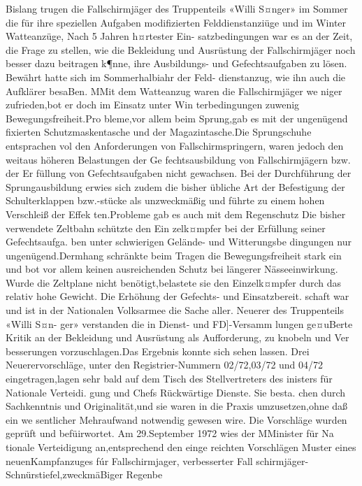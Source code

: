 Bislang trugen die Fallschirmjäger des Truppenteils
«Willi S¤nger» im Sommer die für ihre speziellen
Aufgaben modifizierten Felddienstanziüge und im
Winter Watteanzüge, Nach 5 Jahren h¤rtester Ein-
satzbedingungen war es an der Zeit, die Frage zu
stellen, wie die Bekleidung und Ausrüstung
der
Fallschirmjäger noch besser dazu beitragen k¶nne,
ihre Ausbildungs- und Gefechtsaufgaben zu lösen.
Bewährt hatte sich im Sommerhalbiahr der Feld-
dienstanzug, wie ihn auch die Aufklärer besaBen. MMit dem Watteanzug waren die Fallschirmjäger we
niger zufrieden,bot er doch im Einsatz unter Win
terbedingungen zuwenig Bewegungsfreiheit.Pro
bleme,vor allem beim Sprung,gab es mit der
ungenügend fixierten Schutzmaskentasche und der
Magazintasche.Die Sprungschuhe entsprachen vol
den Anforderungen von Fallschirmspringern, waren
jedoch den weitaus höheren Belastungen der Ge
fechtsausbildung von Fallschirmjägern bzw. der Er
füllung von Gefechtsaufgaben nicht gewachsen. Bei
der Durchführung der Sprungausbildung erwies
sich zudem die bisher übliche Art der Befestigung
der Schulterklappen bzw.-stücke als unzweckmäßig
und führte zu einem hohen Verschleiß der Effek
ten.Probleme gab es auch mit dem Regenschutz
Die bisher verwendete Zeltbahn schützte den Ein
zelk¤mpfer bei der Erfüllung seiner Gefechtsaufga.
ben unter schwierigen Gelände- und Witterungsbe
dingungen nur ungenügend.Dermhang
schränkte beim Tragen die Bewegungsfreiheit stark
ein und bot vor allem keinen ausreichenden Schutz
bei längerer Nässeeinwirkung. Wurde die Zeltplane
nicht benötigt,belastete sie den Einzelk¤mpfer
durch das relativ hohe Gewicht.
Die Erhöhung der Gefechts- und Einsatzbereit.
schaft war und ist in der Nationalen Volksarmee die
Sache aller. Neuerer des Truppenteils «Willi S¤n-
ger» verstanden die in Dienst- und FD]-Versamm
lungen ge¤uBerte Kritik an der Bekleidung und
Ausrüstung als Aufforderung, zu knobeln und Ver
besserungen vorzuschlagen.Das Ergebnis konnte
sich sehen lassen. Drei Neuerervorschläge, unter
den Registrier-Nummern 02/72,03/72 und 04/72
eingetragen,lagen sehr bald auf dem Tisch des
Stellvertreters des inisters für Nationale Verteidi.
gung und Chefs Rückwärtige Dienste. Sie besta.
chen durch Sachkenntnis und Originalität,und sie
waren in die Praxis umzusetzen,ohne daß ein we
sentlicher Mehraufwand notwendig gewesen wire.
Die Vorschläge wurden geprüft und befüirwortet.
Am 29.September 1972 wies der MMinister für Na
tionale Verteidigung an,entsprechend den einge
reichten Vorschlägen Muster eines neuenKampfanzuges fúr Fallschirmjager,
verbesserter Fall
schirmjäger-Schnürstiefel,zweckmäBiger Regenbe
